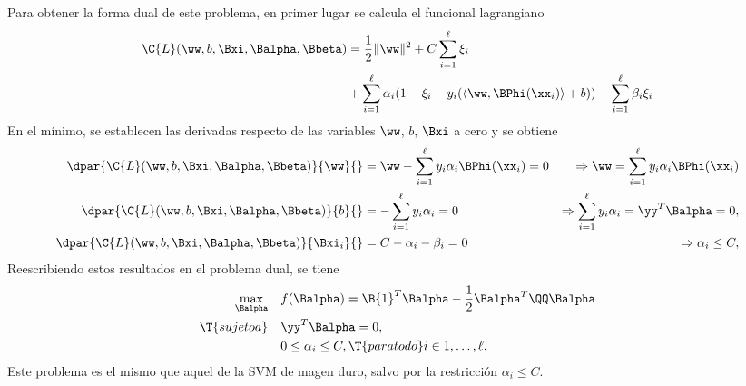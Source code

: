 



Para obtener la forma dual de este problema, en primer lugar se
calcula el funcional lagrangiano
%
\begin{align}
  \begin{split}    
  \C{L}(\ww,b,\Bxi,\Balpha,\Bbeta) &= \frac{1}{2} \|\ww\|^2 + C \sum_{i=1}^{\ell} \xi_i \\
  &+ \sum_{i=1}^{\ell} \alpha_i (1-\xi_i-y_i(\langle\ww,\BPhi(\xx_i)\rangle+b)) - \sum_{i=1}^{\ell} \beta_i\xi_i
  \end{split}
\end{align}
%
En el mínimo, se establecen las derivadas respecto de las variables
$\ww$, $b$, $\Bxi$ a cero y se obtiene
%
\begin{align}
  \dpar{ \C{L}(\ww,b,\Bxi,\Balpha,\Bbeta)}{\ww}{}
    &=\ww-\sum_{i=1}^\ell y_i\alpha_i\BPhi(\xx_i) = 0
    &\Rightarrow \ww = \sum_{i=1}^\ell y_i\alpha_i\BPhi(\xx_i)
  \\
  \dpar{ \C{L}(\ww,b,\Bxi,\Balpha,\Bbeta)}{b}{}
    &=-\sum_{i=1}^\ell y_i\alpha_i = 0
    &\Rightarrow \sum_{i=1}^\ell y_i\alpha_i = \yy^T\Balpha = 0,\\  
  \dpar{ \C{L}(\ww,b,\Bxi,\Balpha,\Bbeta)}{\Bxi_i}{}
    &=C-\alpha_i-\beta_i = 0
    &\Rightarrow \alpha_i \leq C,
\end{align}
%
Reescribiendo estos resultados en el problema dual, se tiene
%
\begin{align}
\begin{split}\label{svmprob-dual-soft}
    \max_{\Balpha} \quad
    & f(\Balpha) = \B{1}^T\Balpha-\frac{1}{2}\Balpha^T\QQ\Balpha\\
    \T{sujeto a}\quad & \yy^T\Balpha = 0, \\
                      & 0\leq\alpha_i\leq C, \T{ para todo } i\in {1,\ldots,\ell }.
\end{split}\end{align}
%
Este problema es el mismo que aquel de la SVM de magen duro, salvo por la restricción
$\alpha_i\leq C$.

